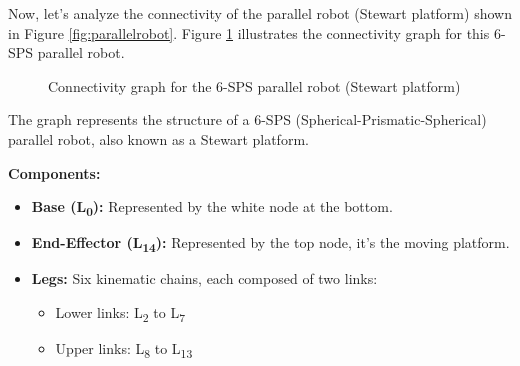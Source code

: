 \begin{solution}
    Now, let's analyze the connectivity of the parallel robot (Stewart platform) shown in Figure \ref{fig:parallelrobot}. Figure \ref{fig:connectivity_graph_6sps_detailed} illustrates the connectivity graph for this 6-SPS parallel robot.
\begin{figure}[H]
	\centering
	\caption{Connectivity graph for the 6-SPS parallel robot (Stewart platform)}
	\label{fig:connectivity_graph_6sps_detailed}
\end{figure}

\begin{description}
	\item[Connectivity Graph:] The graph represents the structure of a 6-SPS (Spherical-Prismatic-Spherical) parallel robot, also known as a Stewart platform.
	
	\item \textbf{Components:}
	\begin{itemize}
		\item \textbf{Base (L\textsubscript{0}):} Represented by the white node at the bottom.
		\item \textbf{End-Effector (L\textsubscript{14}):} Represented by the top node, it's the moving platform.
		\item \textbf{Legs:} Six kinematic chains, each composed of two links:
		\begin{itemize}
			\item Lower links: L\textsubscript{2} to L\textsubscript{7}
			\item Upper links: L\textsubscript{8} to L\textsubscript{13}
		\end{itemize}
	\end{itemize}
	

\end{description}
\end{solution}
